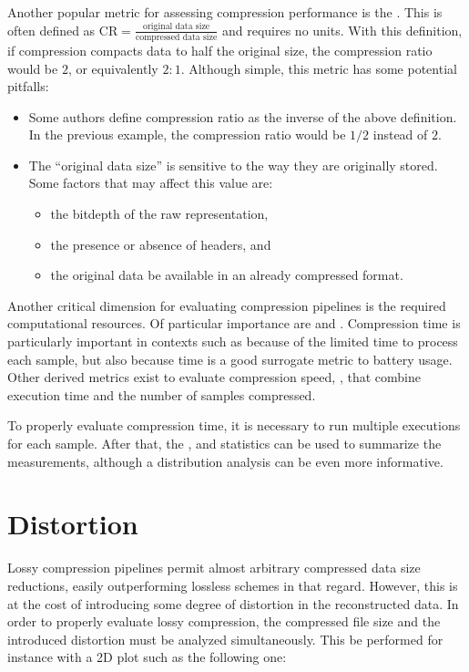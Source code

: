 Another popular metric for assessing compression performance is the .
This is often defined as $\displaystyle \textrm{CR} = \frac{\textrm{original data size}}{\textrm{compressed data size}}$ and requires no units.
%
With this definition, if compression compacts data to half the original size,
the compression ratio would be $2$, or equivalently $2:1$. Although simple, this metric has some potential pitfalls:
\begin{itemize}
\item Some authors define compression ratio as the inverse of the above definition. In the previous example,
the compression ratio would be $1/2$ instead of $2$.
\item The ``original data size'' is sensitive to the way they are originally stored. Some factors that may affect this value are:
\begin{itemize}
    \item the bitdepth of the raw representation,
    \item the presence or absence of headers, and
    \item the original data be available in an already compressed format.
\end{itemize}
\end{itemize}

Another critical dimension for evaluating compression pipelines is the required computational resources. Of particular importance are  and . Compression time is particularly important in contexts such as  because of the limited time to process each sample, but also because time is a good surrogate metric to battery usage.
%
Other derived metrics exist to evaluate compression speed, \eg {},
that combine execution time and the number of samples compressed.

To properly evaluate compression time, it is necessary to run multiple executions for each sample.
After that, the ,  and  statistics can be used
to summarize the measurements, although a distribution analysis can be even more informative.

\section{Distortion}

Lossy compression pipelines permit almost arbitrary compressed data size reductions,
easily outperforming lossless schemes in that regard. However, this is at the cost
of introducing some degree of distortion in the reconstructed data.
%
In order to properly evaluate lossy compression, the compressed file size
and the introduced distortion must be analyzed simultaneously.
This  be performed for instance with a 2D plot
such as the following one:

